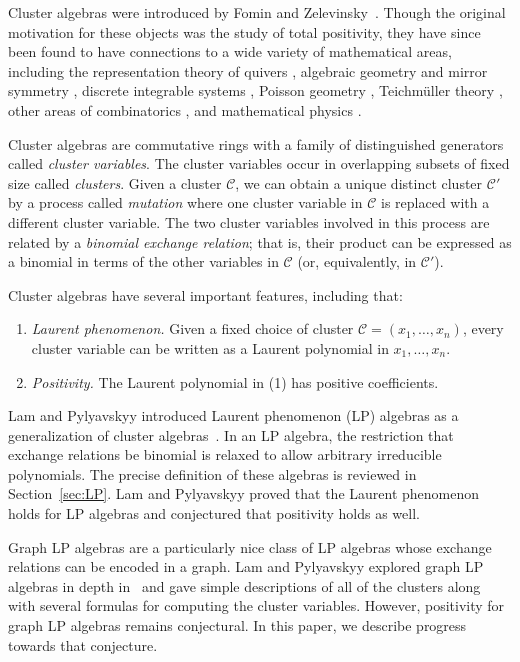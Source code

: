 \documentclass[pdftex]{sigma}
\numberwithin{equation}{section}
\newcommand{\calC}{\mathcal{C}}
\begin{document}
Cluster algebras were introduced by Fomin and Zelevinsky~\cite{FZ-02}. Though the original motivation for these objects was the study of total positivity, they have since been found to have connections to a wide variety of mathematical areas, including the representation theory of quivers \cite{BMRRT-06, K-10, R-10}, algebraic geometry and mirror symmetry \cite{B-17,GHK-15}, discrete integrable systems \cite{FH-13, K-10-II}, Poisson geometry \cite{GSV-05,GSV-10}, Teichm\"uller theory \cite{FG-09, FG-10, FT-18, GSV-05}, other areas of combinatorics \cite{BMDKTY-18,C-04, CFZ-02,IT-09}, and mathematical physics \cite{C-04,F-12}.

Cluster algebras are commutative rings with a family of distinguished generators called \emph{cluster variables}. The cluster variables occur in overlapping subsets of fixed size called \emph{clusters}. Given a cluster $\calC$, we can obtain a unique distinct cluster $\calC'$ by a process called \emph{mutation} where one cluster variable in $\calC$ is replaced with a different cluster variable. The two cluster variables involved in this process are related by a \emph{binomial exchange relation}; that is, their product can be expressed as a binomial in terms of the other variables in $\calC$ (or, equivalently, in $\calC'$).

Cluster algebras have several important features, including that:
\begin{enumerate}\itemsep=0pt
 \item[(1)] \emph{Laurent phenomenon.} Given a fixed choice of cluster $\calC=(x_1,\dots,x_n)$, every cluster vari\-able can be written as a Laurent polynomial in $x_1,\dots,x_n$.
 \item[(2)] \emph{Positivity.} The Laurent polynomial in (1) has positive coefficients.
\end{enumerate}

Lam and Pylyavskyy introduced Laurent phenomenon (LP) algebras as a generalization of cluster algebras~\cite{LP-12}. In an LP algebra, the restriction that exchange relations be binomial is relaxed to allow arbitrary irreducible polynomials. The precise definition of these algebras is reviewed in Section~\ref{sec:LP}. Lam and Pylyavskyy proved that the Laurent phenomenon holds for LP algebras and conjectured that positivity holds as well.

Graph LP algebras are a particularly nice class of LP algebras whose exchange relations can be encoded in a graph. Lam and Pylyavskyy explored graph LP algebras in depth in~\cite{LP-16} and gave simple descriptions of all of the clusters along with several formulas for computing the cluster variables. However, positivity for graph LP algebras remains conjectural. In this paper, we describe progress towards that conjecture.
\end{document}
